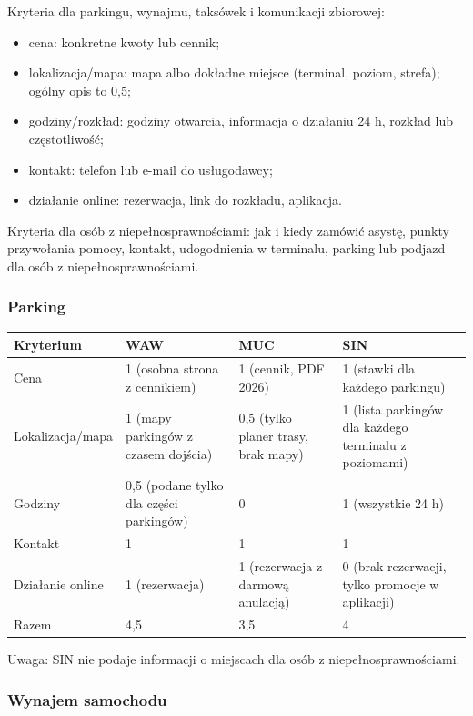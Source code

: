 \documentclass[11pt,a4paper]{article}
\begin{document}
Kryteria dla parkingu, wynajmu, taksówek i komunikacji zbiorowej:
\begin{itemize}[leftmargin=*]
  \item cena: konkretne kwoty lub cennik;
  \item lokalizacja/mapa: mapa albo dokładne miejsce (terminal, poziom, strefa); ogólny opis to 0,5;
  \item godziny/rozkład: godziny otwarcia, informacja o działaniu 24 h, rozkład lub częstotliwość;
  \item kontakt: telefon lub e-mail do usługodawcy;
  \item działanie online: rezerwacja, link do rozkładu, aplikacja.
\end{itemize}

Kryteria dla osób z niepełnosprawnościami: jak i kiedy zamówić asystę, punkty przywołania pomocy, kontakt, udogodnienia w terminalu, parking lub podjazd dla osób z niepełnosprawnościami.

\subsubsection*{Parking}

{\small
\begin{tabularx}{\textwidth}{@{}L{2.8cm}YYY@{}}
\toprule
Kryterium & WAW & MUC & SIN \\
\midrule
Cena & 1 (osobna strona z cennikiem) & 1 (cennik, PDF 2026) & 1 (stawki dla każdego parkingu) \\
Lokalizacja/mapa & 1 (mapy parkingów z czasem dojścia) & 0,5 (tylko planer trasy, brak mapy) & 1 (lista parkingów dla każdego terminalu z poziomami) \\
Godziny & 0,5 (podane tylko dla części parkingów) & 0 & 1 (wszystkie 24 h) \\
Kontakt & 1 & 1 & 1 \\
Działanie online & 1 (rezerwacja) & 1 (rezerwacja z darmową anulacją) & 0 (brak rezerwacji, tylko promocje w aplikacji) \\
\midrule
Razem & 4,5 & 3,5 & 4 \\
\bottomrule
\end{tabularx}
}

Uwaga: SIN nie podaje informacji o miejscach dla osób z niepełnosprawnościami.

\subsubsection*{Wynajem samochodu}
\end{document}
